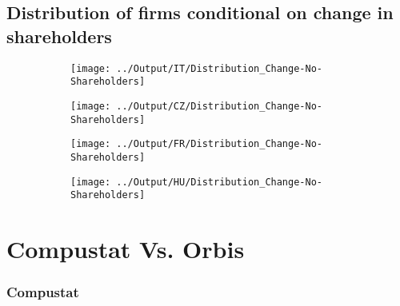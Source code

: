\documentclass[12pt,notitlepage]{article}
\begin{document}
\subsection{Distribution of firms conditional on change in shareholders}

\begin{figure}[!htpb]
\centering
\caption{Distribution of firms conditional on change in shareholders}
\begin{subfigure}{.49\textwidth}
    \centering
 \texttt{[image: ../Output/IT/Distribution\_Change-No-Shareholders]}
\end{subfigure}%
\begin{subfigure}{.49\textwidth}
    \centering
 \texttt{[image: ../Output/CZ/Distribution\_Change-No-Shareholders]}
\end{subfigure}
\begin{subfigure}{.49\textwidth}
    \centering
 \texttt{[image: ../Output/FR/Distribution\_Change-No-Shareholders]}
\end{subfigure}%
\begin{subfigure}{.49\textwidth}
    \centering
 \texttt{[image: ../Output/HU/Distribution\_Change-No-Shareholders]}
\end{subfigure}
\end{figure}
\pagebreak



\FloatBarrier
\section{Compustat Vs. Orbis} %
\label{sec:compustat_vs_orbis}
\FloatBarrier





\subsubsection{Compustat}
\begin{table}[!htpb]
    \centering
    \caption{Descriptive Statistics - Italy}
    \label{tab:my_label}
\end{table}
\end{document}
